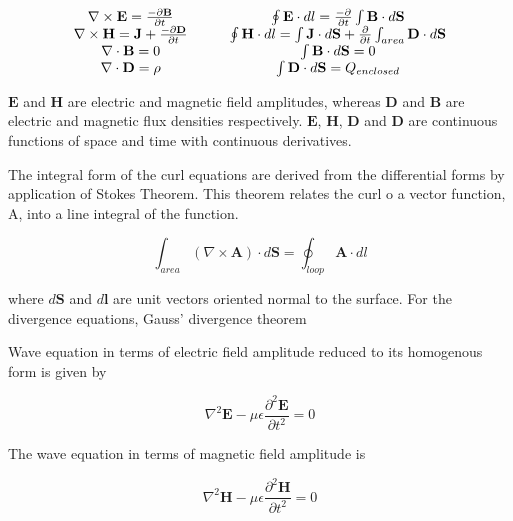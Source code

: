 \begin{equation}
\begin{array}{c c}
\nabla \times \mathbf{E} = \frac{-\partial{\mathbf{B}}}{\partial{t}} &
\qquad \oint \mathbf{E} \cdot dl = \frac{-\partial}{\partial{t}}\int
\mathbf{B} \cdot d \mathbf{S} \\
\nabla \times \mathbf{H} = \mathbf{J} + 
\frac{-\partial{\mathbf{D}}}{\partial{t}} &
\qquad \oint \mathbf{H} \cdot dl = \int \mathbf{J} \cdot d \mathbf{S}
+ \frac{\partial}{\partial{t}}\int_{area} \mathbf{D} \cdot d \mathbf{S} \\
\nabla \cdot \mathbf{B} = 0 &
\qquad \int \mathbf{B} \cdot d\mathbf{S} = 0 \\
\nabla \cdot \mathbf{D} = \rho &
\qquad \int \mathbf{D} \cdot d\mathbf{S} = Q_{enclosed}
\end{array}
\end{equation}

$\mathbf{E}$ and $\mathbf{H}$ are electric and magnetic field
amplitudes, whereas $\mathbf{D}$ and $\mathbf{B}$ are electric and
magnetic flux densities respectively. $\mathbf{E}$, $\mathbf{H}$,
$\mathbf{D}$ and $\mathbf{D}$ are continuous functions of space and
time with continuous derivatives.

The integral form of the curl equations are derived from the
differential forms by application of Stokes Theorem. This
theorem relates the curl o a vector function, A, into a line
integral of the function.

\begin{equation}
\int_{area} ( \nabla \times \mathbf{A} ) \cdot d \mathbf{S} = 
\oint_{loop} \mathbf{A} \cdot dl
\end{equation}

where $d \mathbf{S}$ and $d\mathbf{l}$ are unit vectors oriented normal
to the surface. For the divergence equations, Gauss' divergence theorem

Wave equation in terms of electric field amplitude reduced to its
homogenous form is given by

\begin{equation}
\nabla^2 \mathbf{E} - \mu \epsilon \frac{\partial^2 
  \mathbf{E}}{\partial t^2} = 0
\end{equation}

The wave equation in terms of magnetic field amplitude is 

\begin{equation}
\nabla^2 \mathbf{H} - \mu \epsilon \frac{\partial^2 
  \mathbf{H}}{\partial t^2} = 0
\end{equation}
